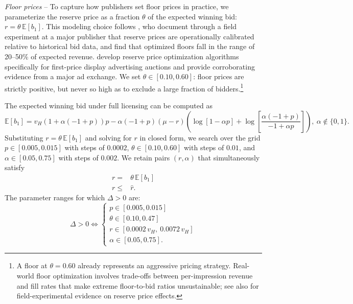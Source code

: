 \noindent \textit{Floor prices} -- To capture how publishers set floor prices in practice, we parameterize the reserve price as a fraction $\theta$ of the expected winning bid: $r = \theta \, \mathbb{E}[b_1]$. This modeling choice follows \textcite{choiOptimizingReservePrices2023}, who document through a field experiment at a major publisher that reserve prices are operationally calibrated relative to historical bid data, and find that optimized floors fall in the range of 20--50\% of expected revenue. \textcite{fengReservePriceOptimization2021} develop reserve price optimization algorithms specifically for first-price display advertising auctions and provide corroborating evidence from a major ad exchange. We set $\theta \in [0.10, 0.60]$: floor prices are strictly positive, but never so high as to exclude a large fraction of bidders.\footnote{A floor at $\theta = 0.60$ already represents an aggressive pricing strategy. Real-world floor optimization involves trade-offs between per-impression revenue and fill rates that make extreme floor-to-bid ratios unsustainable; see also \textcite{ostrovskyReservePricesInternet2023} for field-experimental evidence on reserve price effects.}

\noindent The expected winning bid under full licensing can be computed as
\begin{equation*}
    \mathbb{E}[b_1] = v_H (1+\alpha (-1+p)) p-\alpha (-1+p) (\mu-r) \left(\log[1-\alpha p]+\log\left[\frac{\alpha (-1+p)}{-1+\alpha p}\right]\right), \ \alpha \notin \{0,1\}.
\end{equation*}
Substituting $r = \theta \, \mathbb{E}[b_1]$ and solving for $r$ in closed form, we search over the grid $p \in [0.005, 0.015]$ with steps of $0.0002$, $\theta \in [0.10, 0.60]$ with steps of $0.01$, and $\alpha \in [0.05, 0.75]$ with steps of $0.002$. We retain pairs $(r, \alpha)$ that simultaneously satisfy
\begin{align}
    r =&  \theta \, \mathbb{E}[b_1] \label{eq:cal-floor}\\[5pt]
    r \leq&  \hat{r}. \label{eq:cal-rhat}
\end{align}
The parameter ranges for which $\Delta > 0$ are:
\begin{equation*}
    \Delta > 0 \iff \begin{cases}
        p \in [0.005, 0.015] \\[5pt]
        \theta \in [0.10, 0.47] \\[5pt]
        r \in [0.0002 \, v_H, \ 0.0072 \, v_H] \\[5pt]
        \alpha \in [0.05, 0.75].
    \end{cases}
\end{equation*}

